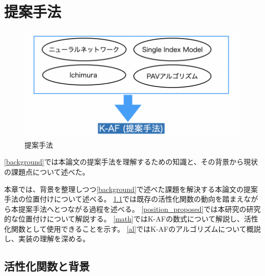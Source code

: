 \chapter{提案手法}
\label{proposed}



\begin{figure}[hbtp]
\includegraphics[width=15cm]{asset/proposed_method.png}
	\caption{提案手法}
	\label{proposed_method}
\end{figure}


\ref{background}では本論文の提案手法を理解するための知識と、その背景から現状の課題点について述べた。

本章では、背景を整理しつつ\ref{background}で述べた課題を解決する本論文の提案手法の位置付けについて述べる。
\ref{history_activation}では既存の活性化関数の動向を踏まえながら本提案手法へとつながる過程を述べる。
\ref{position_proposed}では本研究の研究的な位置付けについて解説する。
\ref{math}ではK-AFの数式について解説し、活性化関数として使用できることを示す。
\ref{al}ではK-AFのアルゴリズムについて概説し、実装の理解を深める。




\section{活性化関数と背景}
\label {history_activation}


